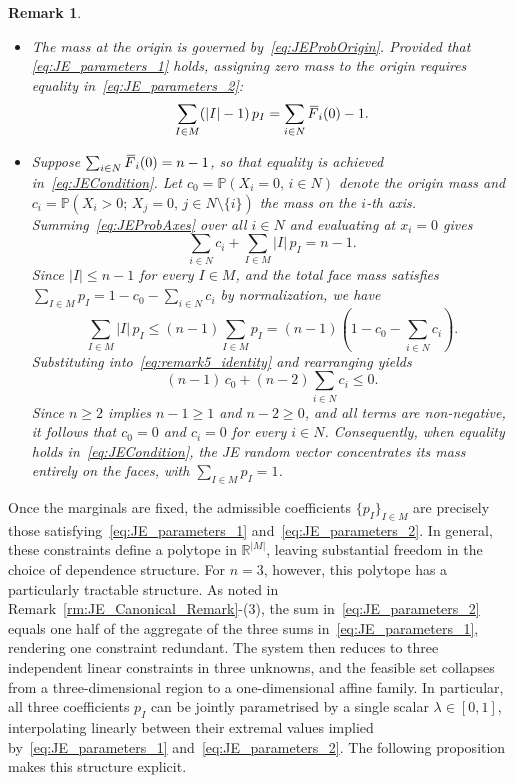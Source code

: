 \documentclass[letterpaper,12pt]{article}
\def \P {\mathbb{P}}
\def \RR {\mathbb{R}}
\numberwithin{equation}{section}
\newtheorem{remark}[theorem]{Remark}
\newcommand{\N}{{N}}
\newcommand{\M}{{M}}
\newcommand{\I}{{I}}
\newcommand{\F}{\,\overline{\kern-0.175em F\kern-0em}}
\begin{document}
{\begin{remark}
\begin{itemize}
\item[(4)]
The mass at the origin is governed by~\eqref{eq:JEProbOrigin}. Provided that
\eqref{eq:JE_parameters_1} holds, assigning zero mass to the origin requires
equality in~\eqref{eq:JE_parameters_2}:
\[
\sum_{\I\in\M}(|\I|-1)\,p_{\I}= \sum_{i\in\N}\F_i(0)-1.
\]

\item[(5)]
Suppose $\sum_{i\in\N}\F_i(0)=n-1$, so that equality is achieved
in~\eqref{eq:JECondition}. Let $c_0=\P(X_i=0,\,i\in\N)$ denote the origin mass
and $c_i=\P(X_i>0;\,X_j=0,\,j\in\N\setminus\{i\})$ the mass on the $i$-th axis.
Summing~\eqref{eq:JEProbAxes} over all $i\in\N$ and evaluating at $x_i=0$ gives
\begin{equation}
\label{eq:remark5_identity}
\sum_{i\in\N}c_i+\sum_{\I\in \M}|\I|\,p_{\I}=n-1.
\end{equation}
Since $|\I|\le n-1$ for every $\I\in\M$, and the total face mass satisfies
$\sum_{\I\in\M}p_\I=1-c_0-\sum_{i\in\N}c_i$ by normalization, we have
\[
\sum_{\I\in\M}|\I|\,p_\I\le (n-1)\sum_{\I\in\M}p_\I
=(n-1)\left(1-c_0-\sum_{i\in\N}c_i\right).
\]
Substituting into~\eqref{eq:remark5_identity} and rearranging yields
\[
(n-1)\,c_0+(n-2)\sum_{i\in\N}c_i\le 0.
\]
Since $n\ge 2$ implies $n-1\ge1$ and $n-2\ge0$, and all terms are
non-negative, it follows that $c_0=0$ and $c_i=0$ for every $i\in\N$. Consequently,
when equality holds in~\eqref{eq:JECondition}, the JE random vector concentrates
its mass entirely on the faces, with $\sum_{\I\in\M}p_\I=1$.
\end{itemize}
\end{remark}

Once the marginals are fixed, the admissible coefficients $\{p_\I\}_{\I\in\M}$ are
precisely those satisfying~\eqref{eq:JE_parameters_1} and~\eqref{eq:JE_parameters_2}.
In general, these constraints define a polytope in $\RR^{|\M|}$, leaving
substantial freedom in the choice of dependence structure. For $n=3$, however,
this polytope has a particularly tractable structure. As noted in
Remark~\ref{rm:JE_Canonical_Remark}-(3), the sum in~\eqref{eq:JE_parameters_2}
equals one half of the aggregate of the three sums in~\eqref{eq:JE_parameters_1},
rendering one constraint redundant. The system then reduces to three independent
linear constraints in three unknowns, and the feasible set collapses from a
three-dimensional region to a one-dimensional affine family. In particular, all
three coefficients $p_\I$ can be jointly parametrised by a single scalar
$\lambda\in[0,1]$, interpolating linearly between their extremal values implied
by~\eqref{eq:JE_parameters_1} and~\eqref{eq:JE_parameters_2}. The following
proposition makes this structure explicit.

}
\end{document}
